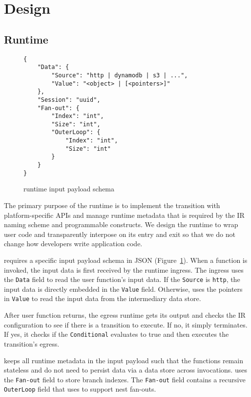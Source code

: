 \section{ Design}











\subsection{\name{} Runtime}

\begin{figure}[]
    \begin{verbatim}
{
    "Data": {
        "Source": "http | dynamodb | s3 | ...",
        "Value": "<object> | [<pointers>]"
    },
    "Session": "uuid",
    "Fan-out": {
        "Index": "int",
        "Size": "int",
        "OuterLoop": {
            "Index": "int",
            "Size": "int"
        }
    }
}
    \end{verbatim}
    \caption{\name{} runtime input payload schema}
    \label{fig:input-format}
\end{figure}

The primary purpose of the \name{} runtime is to implement the transition with
platform-specific APIs and manage runtime metadata that is required by the
\name{} IR naming scheme and programmable constructs. We design the runtime to
wrap user code and transparently interpose on its entry and exit so that we do
not change how developers write application code.

 \name{} requires a specific input payload schema in JSON
(Figure~\ref{fig:input-format}). When a function is invoked, the input data is
first received by the runtime ingress. The ingress uses the \texttt{Data}
field to read the user function's input data. If the \texttt{Source} is
\texttt{http}, the input data is directly embedded in the \texttt{Value}
field. Otherwise, \name{} uses the pointers in \texttt{Value} to read the
input data from the intermediary data store.

After user function returns, the egress runtime gets its output and checks the
IR configuration to see if there is a transition to execute. If no, it simply
terminates. If yes, it checks if the \texttt{Conditional} evaluates to true
and then executes the transition's egress.

\name{} keeps all runtime metadata in the input payload such that the
functions remain stateless and do not need to persist data via a data store
across invocations. \name{} uses the \texttt{Fan-out} field to store branch
indexes. The \texttt{Fan-out} field contains a recursive \texttt{OuterLoop}
field that \name{} uses to support nest fan-outs.


